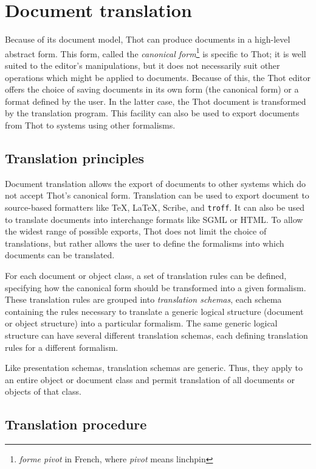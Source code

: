 \section{Document translation}

Because of its document model, Thot can produce documents in a
high-level abstract form.  This form, called the {\em canonical
form}\footnote{{\em forme pivot} in French, where {\em pivot} means
linchpin} is specific to Thot; it is well suited to the editor's
manipulations, but it does not necessarily suit other operations which
might be applied to documents.  Because of this, the Thot editor
offers the choice of saving documents in its own form (the canonical
form) or a format defined by the user.  In the latter case, the Thot
document is transformed by the translation program.  This facility can
also be used to export documents from Thot to systems using other
formalisms.

\subsection{Translation principles}

Document translation allows the export of documents to other systems
which do not accept Thot's canonical form.  Translation can be used to
export document to source-based formatters like {\TeX}, {\LaTeX},
Scribe, and {\tt troff}.  It can also be used to translate documents
into interchange formats like SGML or HTML.  To allow the widest range of
possible exports, Thot does not limit the choice of translations, but
rather allows the user to define the formalisms into which documents
can be translated.

For each document or object class, a set of translation rules can be
defined, specifying how the canonical form should be transformed into
a given formalism.  These translation rules are grouped into
{\em translation schemas}, each schema containing the rules necessary
to translate a generic logical structure (document or object
structure) into a particular formalism.  The same generic logical
structure can have several different translation schemas, each
defining translation rules for a different formalism.

Like presentation schemas, translation schemas are generic.  Thus,
they apply to an entire object or document class and permit
translation of all documents or objects of that class.

\subsection{Translation procedure}

